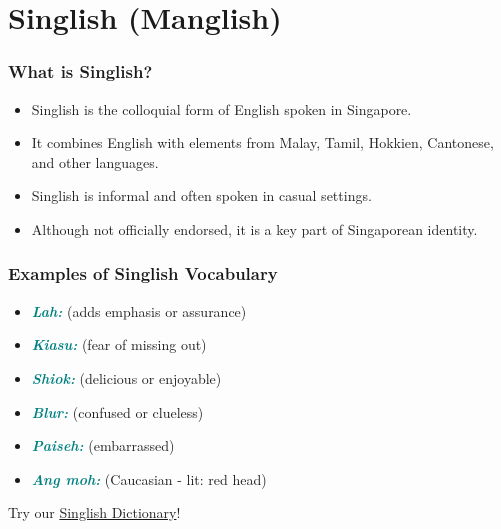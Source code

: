 \documentclass{beamer}
\renewcommand{\mtcitestyle}[1]{\textcolor{teal}{\textit{#1}}}
\newcommand{\lex}[1]{\textbf{\mtcitestyle{#1}}}
\begin{document}
\section{Singlish (Manglish)}


\begin{frame}
\frametitle{What is Singlish?}
\begin{itemize}
    \item Singlish is the colloquial form of English spoken in Singapore.
    \item It combines English with elements from Malay, Tamil, Hokkien, Cantonese, and other languages.
    \item Singlish is informal and often spoken in casual settings.
    \item Although not officially endorsed, it is a key part of Singaporean identity.
\end{itemize}
\end{frame}


\begin{frame}
\frametitle{Examples of Singlish Vocabulary}
\begin{itemize}
\item \lex{Lah:}  (adds emphasis or assurance)
\item \lex{Kiasu:}  (fear of missing out)
\item \lex{Shiok:}  (delicious or enjoyable)
\item \lex{Blur:}  (confused or clueless)
\item \lex{Paiseh:}  (embarrassed)
\item \lex{Ang moh:}  (Caucasian - lit: red head)

\end{itemize}

\begin{center}
  Try our \href{https://singdict.github.io/}{Singlish Dictionary}!
\end{center}
\end{frame}
\end{document}
